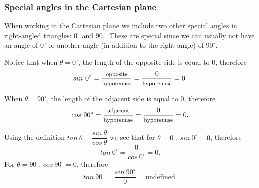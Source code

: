 \subsubsection{Special angles in the Cartesian plane}
When working in the Cartesian plane we include two other special
angles in right-angled triangles: $0^{\circ}$ and $90^{\circ}$. These
are special since we can usually not have an angle of $0^{\circ}$ or
another angle (in addition to the right angle) of $90^{\circ}$.

Notice that when $\theta = 0^{\circ}$, the length of the opposite side
is equal to $0$, therefore
\begin{equation*}
  sin~ 0^{\circ} =
  \dfrac{\mbox{\footnotesize opposite}}{\mbox{\footnotesize hypotenuse}} =
  \dfrac{0}{\mbox{\footnotesize hypotenuse}} =
  0.
\end{equation*}

When $\theta = 90^{\circ}$, the length of the adjacent side is equal
to $0$, therefore
\begin{equation*}
  cos~ 90^{\circ} =
  \dfrac{\mbox{\footnotesize adjacent}}{\mbox{\footnotesize hypotenuse}} =
  \dfrac{0}{\mbox{\footnotesize hypotenuse}} =
  0.
\end{equation*}

Using the definition $tan~ \theta=\dfrac{sin~ \theta}{cos~ \theta}$ we
see that for $\theta =  0^{\circ}$, $sin~ 0^{\circ}=0$, therefore
\begin{equation*}
  tan~ 0^{\circ} =
  \dfrac{0}{cos~ 0^{\circ}} =
  0.
\end{equation*}
For $\theta =  90^{\circ}$, $cos~ 90^{\circ}=0$, therefore
\begin{equation*}
  tan~ 90^{\circ} =
  \dfrac{sin~ 90^{\circ}}{0} =
  \mbox{undefined.}
\end{equation*}

